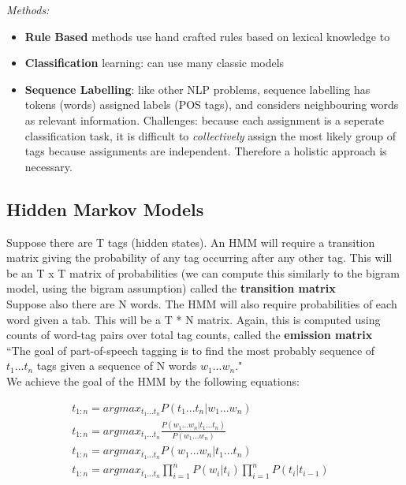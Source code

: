 \documentclass[]{article}
\begin{document}
	\textit{Methods:}
	
	\begin{itemize}
	 \item \textbf{Rule Based} methods use hand crafted rules based on lexical knowledge to 
	 \item \textbf{Classification} learning: can use many classic models
	 \item \textbf{Sequence Labelling}: like other NLP problems, sequence labelling has tokens (words) assigned labels (POS tags), and considers neighbouring words as relevant information. Challenges: because each assignment is a seperate classification task, it is difficult to \textit{collectively} assign the most likely group of tags because assignments are independent. Therefore a holistic approach is necessary. 
	\end{itemize}
	
	\subsection{Hidden Markov Models}
	Suppose there are T tags (hidden states). An HMM will require a transition matrix giving the probability of any tag occurring after any other tag. This will be an T x T matrix of probabilities (we can compute this similarly to the bigram model, using the bigram assumption) called the \textbf{transition matrix}
	\\
	Suppose also there are N words. The HMM will also require probabilities of each word given a tab. This will be a T * N matrix. Again, this is computed using counts of word-tag pairs over total tag counts, called the \textbf{emission matrix}
	\\
	``The goal of part-of-speech tagging is to find the most probably sequence of $t_1...t_n$ tags given a sequence of N words $w_1...w_n$."  
	\\
	We achieve the goal of the HMM by the following equations:
	
	\begin{align}	
		t_{1:n} = argmax_{t_1...t_n} P(t_1...t_n | w_1...w_n) &\tag*{max prb tags given words} \\	
		t_{1:n} = argmax_{t_1...t_n} \frac{P(w_1...w_n | t_1...t_n)}{P(w_1...w_n)} &\tag*{by bayes rule} \\	
		t_{1:n} = argmax_{t_1...t_n} P(w_1...w_n | t_1...t_n) &\tag*{since argmax, can discard denom} \\	
		t_{1:n} = argmax_{t_1...t_n} \prod_{i=1}^n P(w_i|t_i) \prod_{i=1}^n P(t_i|t_{i-1}) &\tag*{by the HMM assumptions} \\	
	\end{align}
	
\end{document}
